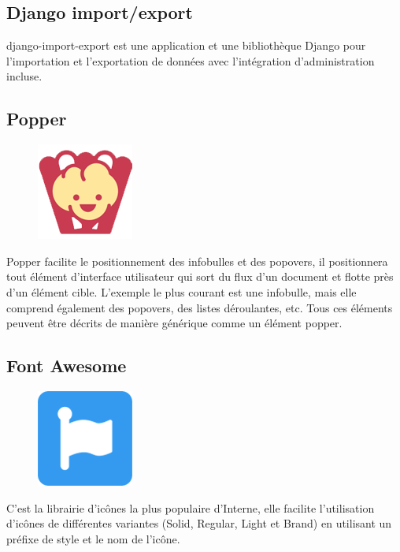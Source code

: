 \subsection{Django import/export}
django-import-export est une application et une bibliothèque Django pour 
l'importation et l'exportation de données avec l'intégration d'administration 
incluse\cite{26}.
    
\subsection{Popper}
    \begin{figure}
        \vspace{-22pt}
        \begin{center}
            \includegraphics[scale=0.36]{images/logo/popper.png}
            \label{fig81}
        \end{center}
        \vspace{-20pt}
        \vspace{-10pt}
    \end{figure}
Popper facilite le positionnement des infobulles et des popovers, il 
positionnera tout élément d'interface utilisateur qui sort du flux d’un document 
et flotte près d'un élément cible. L'exemple le plus courant est une infobulle, 
mais elle comprend également des popovers, des listes déroulantes, etc. Tous ces 
éléments peuvent être décrits de manière générique comme un élément 
popper\cite{27}.
    
\subsection{Font Awesome}
    \begin{figure}
        \vspace{-22pt}
        \begin{center}
            \includegraphics[scale=0.36]{images/logo/fontawesome.png}
            \label{fig82}
        \end{center}
          \vspace{-20pt}
          \vspace{-10pt}
    \end{figure}
C’est la librairie d'icônes la plus populaire d'Interne, elle facilite 
l’utilisation  d’icônes de différentes variantes (Solid, Regular, Light et 
Brand) en utilisant un préfixe de style et le nom de l'icône\cite{28}.

